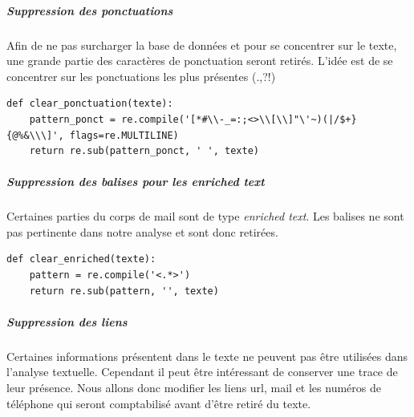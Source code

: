 \documentclass[a4paper,12pt]{article}
\begin{document}
				\subparagraph{Suppression des ponctuations} Afin de ne pas surcharger la base de données et pour se concentrer sur le texte, une grande partie des caractères de ponctuation seront retirés. L'idée est de se concentrer sur les ponctuations les plus présentes (.,?!) 

					\begin{lstlisting}[title=Nettoyage des ponctuations]				
def clear_ponctuation(texte):
    pattern_ponct = re.compile('[*#\\-_=:;<>\\[\\]"\'~)(|/$+}{@%&\\\]', flags=re.MULTILINE)
    return re.sub(pattern_ponct, ' ', texte) \end{lstlisting}

				\subparagraph{Suppression des balises pour les enriched text} Certaines parties du corps de mail sont de type \emph{enriched text}. Les balises ne sont pas pertinente dans notre analyse et sont donc retirées.
						
					\begin{lstlisting}[title=Nettoyage des balises enriched text]
def clear_enriched(texte):
    pattern = re.compile('<.*>')
    return re.sub(pattern, '', texte) \end{lstlisting}
						
				\subparagraph{Suppression des liens} Certaines informations présentent dans le texte ne peuvent pas être utilisées dans l'analyse textuelle. Cependant il peut être intéressant de conserver une trace de leur présence. Nous allons donc modifier les liens url, mail et les numéros de téléphone qui seront comptabilisé avant d'être retiré du texte.
				
\end{document}
